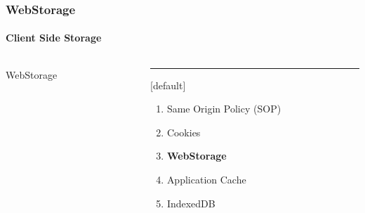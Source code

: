 \begin{frame}
\frametitle{WebStorage}
\framesubtitle{Client Side Storage}
\begin{columns}[T] %
\begin{column}{.48\textwidth}

\begin{center}
{\Huge WebStorage}
\end{center}

\end{column}%
\hfill%
\begin{column}{.48\textwidth}
\color{blue}\rule{\linewidth}{4pt}

	[default]
	\begin{enumerate}
		\item Same Origin Policy (SOP)
		\item Cookies
		\item \textbf{WebStorage}
		\item Application Cache
		\item IndexedDB
	\end{enumerate}
\end{column}%
\end{columns}
\end{frame}


